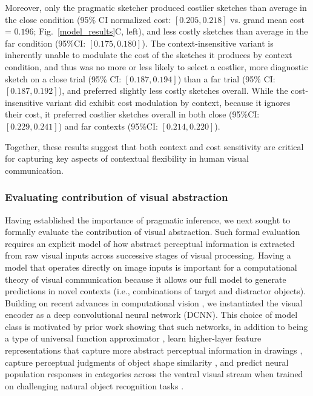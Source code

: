 \documentclass[9pt,twocolumn,twoside]{pnas-new}
\begin{document}
Moreover, only the pragmatic sketcher produced costlier sketches than average in the close condition (95\% CI normalized cost: $[0.205, 0.218]$ vs. grand mean cost = $0.196$; Fig.~\ref{model_results}C, left), and less costly sketches than average in the far condition (95\%CI: $[0.175, 0.180]$). 
The context-insensitive variant is inherently unable to modulate the cost of the sketches it produces by context condition, and thus was no more or less likely to select a costlier, more diagnostic sketch on a close trial (95\% CI: $[0.187, 0.194]$) than a far trial (95\% CI: $[0.187, 0.192]$), and preferred slightly less costly sketches overall. 
While the cost-insensitive variant did exhibit cost modulation by context, because it ignores their cost, it preferred costlier sketches overall in both close (95\%CI: $[0.229, 0.241]$) and far contexts (95\%CI: $[0.214, 0.220]$). 

Together, these results suggest that both context and cost sensitivity are critical for capturing key aspects of contextual flexibility in human visual communication. 

\subsubsection*{Evaluating contribution of visual abstraction}

Having established the importance of pragmatic inference, we next sought to formally evaluate the contribution of visual abstraction.
Such formal evaluation requires an explicit model of how abstract perceptual information is extracted from raw visual inputs across successive stages of visual processing. 
Having a model that operates directly on image inputs is important for a computational theory of visual communication because it allows our full model to generate predictions in novel contexts (i.e., combinations of target and distractor objects).
Building on recent advances in computational vision \cite{FanCommon2018,yamins2014performance}, we instantiated the visual encoder as a deep convolutional neural network (DCNN).
This choice of model class is motivated by prior work showing that such networks, in addition to being a type of universal function approximator \cite{hornik1991approximation}, learn higher-layer feature representations that capture more abstract perceptual information in drawings \cite{FanCommon2018}, capture perceptual judgments of object shape similarity \cite{kubilius2016deep}, and predict neural population responses in categories across the ventral visual stream \cite{yamins2014performance} when trained on challenging natural object recognition tasks \cite{deng2009imagenet}. 
\end{document}
